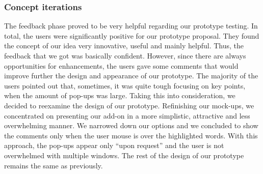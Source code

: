 \subsubsection{Concept iterations}

The feedback phase proved to be very helpful regarding our prototype testing. In 
total, the users were significantly positive for our prototype proposal. They 
found the concept of our  idea very innovative, useful and mainly helpful. Thus, 
the feedback that we got was basically confident. However, since there are 
always opportunities for enhancements, the users gave some comments that would 
improve further the design and appearance of our prototype. The majority of the 
users pointed out that, sometimes, it was quite tough focusing on key points, 
when the amount of pop-ups was large. Taking this into consideration, we decided 
to reexamine the design of our prototype. Refinishing our mock-ups, we 
concentrated on presenting our add-on in a more simplistic, attractive and less 
overwhelming manner. We narrowed down our options and we concluded to show the 
comments only when the user mouse is over the highlighted words. With this 
approach, the pop-ups appear only ``upon request'' and the user is not 
overwhelmed with multiple windows. The rest of the design of our prototype 
remains the same as previously. 
